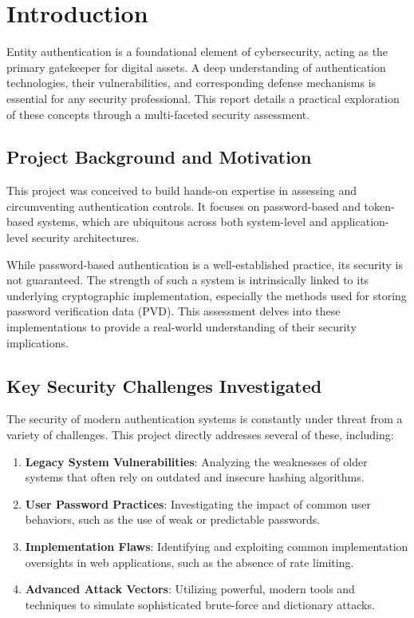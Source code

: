 \section{Introduction}

Entity authentication is a foundational element of cybersecurity, acting as the primary gatekeeper for digital assets. A deep understanding of authentication technologies, their vulnerabilities, and corresponding defense mechanisms is essential for any security professional. This report details a practical exploration of these concepts through a multi-faceted security assessment.

\subsection{Project Background and Motivation}

This project was conceived to build hands-on expertise in assessing and circumventing authentication controls. It focuses on password-based and token-based systems, which are ubiquitous across both system-level and application-level security architectures.

While password-based authentication is a well-established practice, its security is not guaranteed. The strength of such a system is intrinsically linked to its underlying cryptographic implementation, especially the methods used for storing password verification data (PVD). This assessment delves into these implementations to provide a real-world understanding of their security implications.

\subsection{Key Security Challenges Investigated}

The security of modern authentication systems is constantly under threat from a variety of challenges. This project directly addresses several of these, including:

\begin{enumerate}
    \item \textbf{Legacy System Vulnerabilities}: Analyzing the weaknesses of older systems that often rely on outdated and insecure hashing algorithms.
    \item \textbf{User Password Practices}: Investigating the impact of common user behaviors, such as the use of weak or predictable passwords.
    \item \textbf{Implementation Flaws}: Identifying and exploiting common implementation oversights in web applications, such as the absence of rate limiting.
    \item \textbf{Advanced Attack Vectors}: Utilizing powerful, modern tools and techniques to simulate sophisticated brute-force and dictionary attacks.
\end{enumerate}

